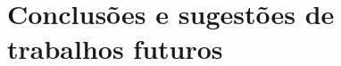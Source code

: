 \chapter[Conclusões e sugestões de trabalhos futuros]{Conclusões e sugestões de trabalhos futuros}

